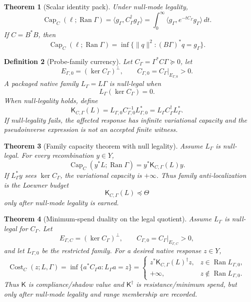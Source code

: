\documentclass[11pt]{article}
\newtheorem{theorem}{Theorem}[section]
\newtheorem{definition}[theorem]{Definition}
\DeclareMathOperator{\range}{Ran}
\DeclareMathOperator{\Cost}{Cost}
\DeclareMathOperator{\Capacity}{Cap}
\newcommand{\K}{\mathsf K}
\newcommand{\Loewner}{\preceq}
\begin{document}
\begin{theorem}[Scalar identity pack]
Under null-mode legality,
\[
  \Capacity_C(\ell;\range\Gamma)=\langle g_\Gamma,C_\Gamma^\dagger g_\Gamma\rangle
  =\int_0^\infty\langle g_\Gamma,e^{-tC_\Gamma}g_\Gamma\rangle\,dt.
\]
If \(C=B^*B\), then
\[
  \Capacity_C(\ell;\range\Gamma)=\inf\{\|q\|^2:(B\Gamma)^*q=g_\Gamma\}.
\]
\end{theorem}

\begin{definition}[Probe-family currency]
Let \(C_\Gamma=\Gamma^*C\Gamma\succeq0\), let
\[
  E_{\Gamma,0}=(\ker C_\Gamma)^\perp,
  \qquad
  C_{\Gamma,0}=C_\Gamma|_{E_{\Gamma,0}}>0.
\]
A packaged native family \(L_\Gamma=L\Gamma\) is null-legal when
\[
  L_\Gamma(\ker C_\Gamma)=0.
\]
When null-legality holds, define
\[
  \K_{C,\Gamma}(L)
  =L_{\Gamma,0}C_{\Gamma,0}^{-1}L_{\Gamma,0}^*
  =L_\Gamma C_\Gamma^\dagger L_\Gamma^*.
\]
If null-legality fails, the affected response has infinite variational capacity and the pseudoinverse expression is not an accepted finite witness.
\end{definition}

\begin{theorem}[Family capacity theorem with null legality]
Assume \(L_\Gamma\) is null-legal.  For every recombination \(y\in Y\),
\[
  \Capacity_C(y^*L;\range\Gamma)=y^*\K_{C,\Gamma}(L)y.
\]
If \(L_\Gamma^*y\) sees \(\ker C_\Gamma\), the variational capacity is \(+\infty\).  Thus family anti-localization is the Loewner budget
\[
  \K_{C,\Gamma}(L)\Loewner\Theta
\]
only after null-mode legality is earned.
\end{theorem}

\begin{theorem}[Minimum-spend duality on the legal quotient]
Assume \(L_\Gamma\) is null-legal for \(C_\Gamma\).  Let
\[
  E_{\Gamma,C}=(\ker C_\Gamma)^\perp,
  \qquad C_{\Gamma,0}=C_\Gamma|_{E_{\Gamma,C}}>0,
\]
and let \(L_{\Gamma,0}\) be the restricted family.  For a desired native response \(z\in Y\),
\[
  \Cost_C(z;L,\Gamma)=\inf\{a^*C_\Gamma a:L_\Gamma a=z\}
  =
  \begin{cases}
    z^*\K_{C,\Gamma}(L)^\dagger z, & z\in \range L_{\Gamma,0},\\
    +\infty, & z\notin \range L_{\Gamma,0}.
  \end{cases}
\]
Thus \(\K\) is compliance/shadow value and \(\K^\dagger\) is resistance/minimum spend, but only after null-mode legality and range membership are recorded.
\end{theorem}
\end{document}
